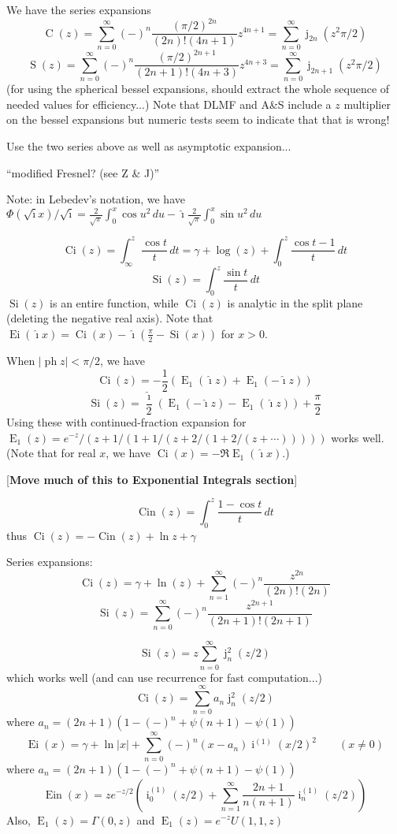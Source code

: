 \documentclass[10pt,dvipdfmx,letterpaper,twoside]{article}
\let\O=\operatorname
\newcommand{\ii}{{\hat{\imath}}}
\newenvironment{implementation}{\noindent\begin{framed}}{\end{framed}}
\let\gam=\gamma
\let\Gam=\Gamma
\begin{document}
We have the series expansions
\[ \O{C}(z) = \sum_{n=0}^\infty(-)^n\frac{(\pi/2)^{2n}}{(2n)!(4n+1)}z^{4n+1}
    = \sum_{n=0}^\infty \O{j}_{2n}(z^2\pi/2) \]
\[ \O{S}(z) = \sum_{n=0}^\infty(-)^n\frac{(\pi/2)^{2n+1}}{(2n+1)!(4n+3)}z^{4n+3}
    = \sum_{n=0}^\infty \O{j}_{2n+1}(z^2\pi/2) \]
(for using the spherical bessel expansions, should extract the whole sequence of needed values for efficiency...)
Note that DLMF and A\&S include a $z$ multiplier on the bessel expansions but numeric tests seem to indicate that that
is wrong!
\begin{implementation}
Use the two series above as well as asymptotic expansion...
\end{implementation}

``modified Fresnel? (see Z \& J)''

Note: in Lebedev's notation, we have
$\Phi(\sqrt\ii x)/\sqrt\ii = \frac{2}{\sqrt\pi}\int_0^x\cos u^2\,du -  \ii\frac{2}{\sqrt\pi}\int_0^x\sin u^2\,du$

\[ \O{Ci}(z) = \int_\infty^z\frac{\cos t}{t}\,dt = \gam + \log(z) + \int_0^z \frac{\cos t - 1}{t}\,dt \]
\[ \O{Si}(z) = \int_0^z \frac{\sin t}{t}\,dt \]
$\O{Si}(z)$ is an entire function, while $\O{Ci}(z)$ is analytic in the split plane (deleting the negative real axis).
Note that $\O{Ei}(\ii x) = \O{Ci}(x) - \ii(\frac\pi2 - \O{Si}(x))$ for $x>0$.

When $|\O{ph} z| < \pi/2$, we have
\[ \O{Ci}(z) = -\frac12\left( \O{E}_1(\ii z) + \O{E}_1(-\ii z) \right) \]
\[ \O{Si}(z) = \frac\ii2\left( \O{E}_1(-\ii z) - \O{E}_1(\ii z) \right) + \frac\pi2 \]
Using these with continued-fraction expansion for $\O{E}_1(z) = e^{-z}/(z+1/(1+1/(z+2/(1+2/(z+\cdots)))))$ works well.
(Note that for real $x$, we have $\O{Ci}(x) = -\Re \O{E}_1(\ii x)$.)

[{\bf Move much of this to Exponential Integrals section}]

\[ \O{Cin}(z) = \int_0^z\frac{1-\cos t}{t}\,dt \]
thus $\O{Ci}(z) = -\O{Cin}(z) + \ln z + \gam$

Series expansions:
\[ \O{Ci}(z) = \gamma + \ln(z) + \sum_{n=1}^\infty (-)^n \frac{z^{2n}}{(2n)!(2n)} \]
\[ \O{Si}(z) = \sum_{n=0}^\infty (-)^n \frac{z^{2n+1}}{(2n+1)!(2n+1)} \]

\[ \O{Si}(z) = z\sum_{n=0}^\infty \O{j}^2_n(z/2) \]
which works well (and can use recurrence for fast computation...)
\[ \O{Ci}(z) = \sum_{n=0}^\infty a_n\O{j}^2_n(z/2) \]
where $a_n = (2n+1)\left(1 - (-)^n + \psi(n+1) - \psi(1)\right)$
\[ \O{Ei}(x) = \gam + \ln|x| + \sum_{n=0}^\infty (-)^n (x-a_n) \O{i}^{(1)}(x/2)^2 \qquad (x\neq 0) \]
where $a_n = (2n+1)\left(1 - (-)^n + \psi(n+1) - \psi(1)\right)$
\[ \O{Ein}(x) = z e^{-z/2}\left( \O{i}^{(1)}_0(z/2) + \sum_{n=1}^\infty \frac{2n+1}{n(n+1)} \O{i}^{(1)}_n(z/2) \right) \]
Also, $\O{E}_1(z) = \Gam(0,z)$ and $\O{E}_1(z) = e^{-z} U(1,1,z)$
\end{document}
